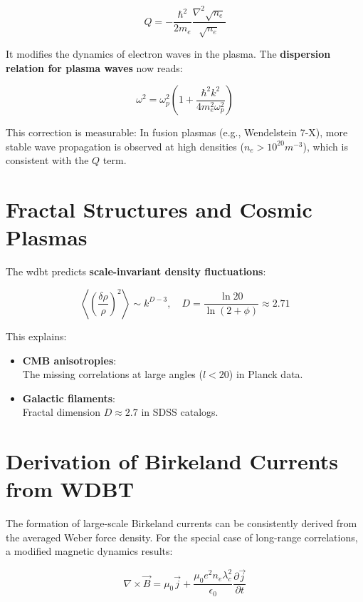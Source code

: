 \begin{equation}
    \label{eq:quantenpotential}
    Q = -\frac{\hbar^2}{2m_e} \frac{\nabla^2 \sqrt{n_e}}{\sqrt{n_e}}
\end{equation}

It modifies the dynamics of electron waves in the plasma. The \textbf{dispersion relation for plasma waves} now reads:

\begin{equation}
    \label{eq:dispersionrelation}
    \omega^2 = \omega_p^2 \left( 1 + \frac{\hbar^2 k^2}{4 m_e^2 \omega_p^2} \right)
\end{equation}

This correction is measurable: In fusion plasmas (e.g., Wendelstein 7-X), more stable wave propagation is observed at high densities ($n_e > 10^{20} m^{-3}$), which is consistent with the $Q$ term.

\section{Fractal Structures and Cosmic Plasmas}
The \gls{wdbt} predicts \textbf{scale-invariant density fluctuations}:

\begin{equation}
    \label{eq:dichtefluktuation}
    \left\langle \left( \frac{\delta \rho}{\rho} \right)^2 \right\rangle \sim k^{D-3}, \quad D = \frac{\ln 20}{\ln(2+\phi)} \approx 2.71
\end{equation}

This explains:

\begin{itemize}
    \item \textbf{CMB anisotropies}:\\The missing correlations at large angles ($l < 20$) in Planck data.
    \item \textbf{Galactic filaments}:\\Fractal dimension $D \approx 2.7$ in SDSS catalogs.
\end{itemize}

\section{Derivation of Birkeland Currents from WDBT}
The formation of large-scale Birkeland currents can be consistently derived from the averaged Weber force density. For the special case of long-range correlations, a modified magnetic dynamics results:

\begin{equation}
    \label{eq:birkeland_ampere}
    \nabla \times \vec{B} = \mu_0 \vec{j} + \frac{\mu_0 e^2 n_e \lambda_c^2}{\epsilon_0} \frac{\partial \vec{j}}{\partial t}
\end{equation}

